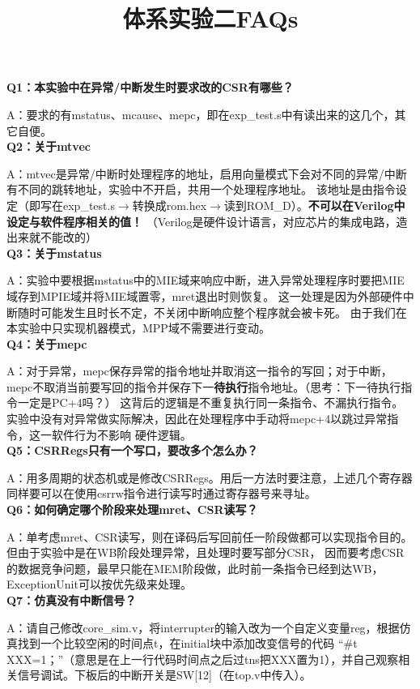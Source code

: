 \documentclass{article}
\title{\textbf{体系实验二FAQs}\vspace{-2em}}
\author{}
\date{}
\begin{document}
\maketitle

\textbf{Q1：本实验中在异常/中断发生时要求改的CSR有哪些？}

A：要求的有mstatus、mcause、mepc，即在exp\_test.s中有读出来的这几个，其它自便。\\



\textbf{Q2：关于mtvec}

A：mtvec是异常/中断时处理程序的地址，启用向量模式下会对不同的异常/中断有不同的跳转地址，实验中不开启，共用一个处理程序地址。
该地址是由指令设定（即写在exp\_test.s$\to$转换成rom.hex$\to$读到ROM\_D）。\textbf{不可以在Verilog中设定与软件程序相关的值！}
（Verilog是硬件设计语言，对应芯片的集成电路，造出来就不能改的）\\


\textbf{Q3：关于mstatus}

A：实验中要根据mstatus中的MIE域来响应中断，进入异常处理程序时要把MIE域存到MPIE域并将MIE域置零，mret退出时则恢复。
这一处理是因为外部硬件中断随时可能发生且时长不定，不关闭中断响应整个程序就会被卡死。
由于我们在本实验中只实现机器模式，MPP域不需要进行变动。\\


\textbf{Q4：关于mepc}

A：对于异常，mepc保存异常的指令地址并取消这一指令的写回；对于中断，mepc不取消当前要写回的指令并保存下一\textbf{待执行}指令地址。（思考：下一待执行指令一定是PC+4吗？）
这背后的逻辑是不重复执行同一条指令、不漏执行指令。实验中没有对异常做实际解决，因此在处理程序中手动将mepc+4以跳过异常指令，这一软件行为不影响
硬件逻辑。\\


\textbf{Q5：CSRRegs只有一个写口，要改多个怎么办？}

A：用多周期的状态机或是修改CSRRegs。用后一方法时要注意，上述几个寄存器同样要可以在使用csrrw指令进行读写时通过寄存器号来寻址。\\


\textbf{Q6：如何确定哪个阶段来处理mret、CSR读写？}

A：单考虑mret、CSR读写，则在译码后写回前任一阶段做都可以实现指令目的。但由于实验中是在WB阶段处理异常，且处理时要写部分CSR，
因而要考虑CSR的数据竞争问题，最早只能在MEM阶段做，此时前一条指令已经到达WB，ExceptionUnit可以按优先级来处理。\\


\textbf{Q7：仿真没有中断信号？}

A：请自己修改core\_sim.v，将interrupter的输入改为一个自定义变量reg，根据仿真找到一个比较空闲的时间点t，在initial块中添加改变信号的代码
“\#t XXX=1；”（意思是在上一行代码时间点之后过tns把XXX置为1），并自己观察相关信号调试。下板后的中断开关是SW[12]（在top.v中传入）。
\end{document}
